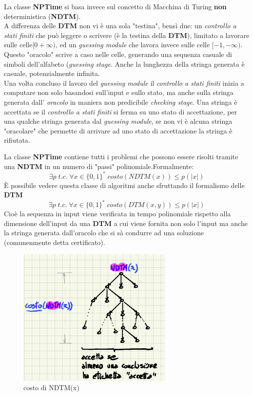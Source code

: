 \documentclass[a4paper]{article}
\begin{document}
La classe \textbf{NPTime} si basa invece sul concetto di Macchina di Turing \textbf{non} deterministica (\textbf{NDTM}).\\
A differenza delle \textbf{DTM} non vi è una sola "testina", bensì due: un \textit{controllo a stati finiti} che può leggere o scrivere (è la testina della \textbf{DTM}), limitato a lavorare sulle celle$[0 + \infty)$, ed un \textit{guessing module} che lavora invece sulle celle $[-1,- \infty)$.\\
Questo "oracolo" scrive a caso nelle celle, generando una sequenza casuale di simboli dell'alfabeto (\textit{guessing stage}.
Anche la lunghezza della stringa generata è casuale, potenzialmente infinita.\\
Una volta concluso il lavoro del \textit{guessing module} il \textit{controllo a stati finiti} inizia a computare non solo basandosi sull'input e sullo stato, ma anche sulla stringa generata dall' \textit{oracolo} in maniera non predicibile \textit{checking stage}.
Una stringa è accettata se il \textit{controllo a stati finiti} si ferma su uno stato di accettazione, per una qualche stringa generata dal \textit{guessing module}, se non vi è alcuna stringa "oracolare" che permette di arrivare ad uno stato di accettazione la stringa è rifiutata.


La classe \textbf{NPTime} contiene tutti i problemi che possono essere risolti tramite una \textbf{NDTM} in un numero di "passi" polinomiale.Formalmente: $$\exists p \; t.c. \; \forall x \in \{0,1\}^* \; costo(NDTM(x)) \leq p(\lvert x \rvert)$$
È possibile vedere questa classe di algoritmi anche sfruttando il formalismo delle \textbf{DTM}
$$\exists p \; t.c. \; \forall x \in \{0,1\}^* \; costo(DTM(x,y)) \leq p(\lvert x \rvert)$$
	Cioè la sequenza in input viene verificata in tempo polinomiale rispetto alla dimensione dell'input da una \textbf{DTM} a cui viene fornita non solo l'input ma anche la stringa generata dall'oracolo che si sà condurre ad una soluzione (comunenmente detta certificato).
\begin{figure}[!ht]
\centering
\includegraphics[scale = 0.5]{./img/E1_NDTM.png}
\caption{costo di NDTM(x)} \label{FIG:E1_NDTM}
\end{figure} 
\end{document}
